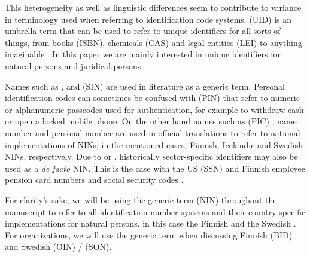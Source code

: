 This heterogeneity as well as linguistic differences seem to contribute to variance in terminology used when referring to identification code systems.  (UID) is an umbrella term that can be used to refer to unique identifiers for all sorts of things, from books (ISBN), chemicals (CAS) and legal entities (LEI) to anything imaginable \citep[see][]{dodge2005}. In this paper we are mainly interested in unique identifiers for natural persons and juridical persons. 

Names such as  \citep{dodge2005},  \citep{alastalo2022} and  (SIN) \citep{otjacques2007} are used in literature as a generic term. Personal identification codes can sometimes be confused with  (PIN) that refer to numeric or alphanumeric passcodes used for authentication, for example to withdraw cash or open a locked mobile phone. On the other hand names such as  (PIC) \citep{hetudvv, sund2012}, name number \citep{watson2010} and personal number \citep{scb2016} are used in official translations to refer to national implementations of NINs; in the mentioned cases, Finnish, Icelandic and Swedish NINs, respectively. Due to  \citep[see][]{brensinger2021, alastalo2022} or  \citep[see][]{dodge2005}, historically sector-specific identifiers may also be used as a \emph{de facto} NIN. This is the case with the US  (SSN) \citep{brensinger2021} and Finnish employee pension card numbers and social security codes \citep{alastalo2022}.

For clarity's sake, we will be using the generic term  (NIN) throughout the manuscript to refer to all identification number systems and their country-specific implementations for natural persons, in this case the Finnish  and the Swedish . For organizations, we will use the generic term  when discussing Finnish  (BID) and Swedish  (OIN) /  (SON).

